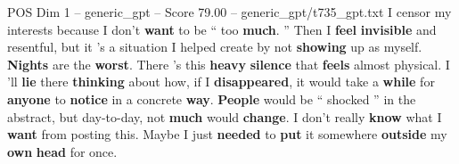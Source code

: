 \begin{textsample}{POS Dim 1 – generic\_gpt – Score 79.00 – generic\_gpt/t735\_gpt.txt}
I censor my interests because I don't \textbf{want} to be “ too \textbf{much}. ” Then I \textbf{feel} \textbf{invisible} and resentful, but it ’s a situation I helped create by not \textbf{showing} up as myself. \textbf{Nights} are the \textbf{worst}.
There ’s this \textbf{heavy} \textbf{silence} that \textbf{feels} almost physical.
I ’ll \textbf{lie} there \textbf{thinking} about how, if I \textbf{disappeared}, it would take a \textbf{while} for \textbf{anyone} to \textbf{notice} in a concrete \textbf{way}. \textbf{People} would be “ shocked ” in the abstract, but day-to-day, not \textbf{much} would \textbf{change}.
I don't really \textbf{know} what I \textbf{want} from posting this.
Maybe I just \textbf{needed} to \textbf{put} it somewhere \textbf{outside} my \textbf{own} \textbf{head} for once.

\end{textsample}
